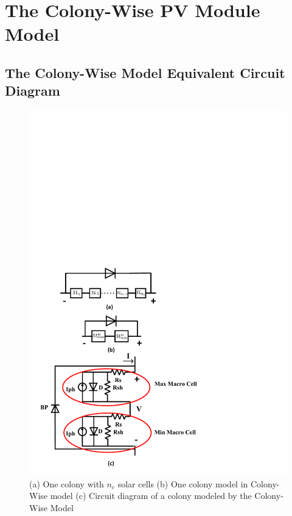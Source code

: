 \section{The Colony-Wise PV Module Model}
\subsection{The Colony-Wise Model Equivalent Circuit Diagram}
\begin{figure}[tb]
    \centering
    \includegraphics[width=1\columnwidth]{figs/cw_model_diagram.pdf}
    \caption{(a) One colony with $n_c$ solar cells (b) One colony model in Colony-Wise model (c) Circuit diagram of a colony modeled by the Colony-Wise Model}
    \label{fig:cwDiagram}
\end{figure}

